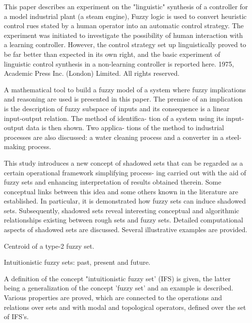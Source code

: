 \cite{Mamdani1975} This paper describes an experiment on the "linguistic"
synthesis of a controller for a model industrial plant (a steam engine), Fuzzy
logic is used to convert heuristic control rues stated by a human operator into
an automatic control strategy. The experiment was initiated to investigate the
possibility of human interaction with a learning controller. However, the
control strategy set up linguistically proved to be far better than expected in
its own right, and the basic experiment of linguistic control synthesis in a
non-learning controller is reported here. {\textcopyright} 1975, Academic Press
Inc. (London) Limited. All rights reserved.

\cite{Takagi1985} A mathematical tool to build a fuzzy model of a system where
fuzzy implications and reasoning are used is presented in this paper. The
premise of an implication is the description of fuzzy subspace of inputs and its
consequence is a linear input-output relation. The method of identifica- tion of
a system using its input-output data is then shown. Two applica- tions of the
method to industrial processes are also discussed: a water cleaning process and
a converter in a steel-making process.


\cite{Pedrycz1998} This study introduces a new concept of shadowed sets that
can be regarded as a certain operational framework simplifying process- ing
carried out with the aid of fuzzy sets and enhancing interpretation of results
obtained therein. Some conceptual links between this idea and some others known
in the literature are established. In particular, it is demonstrated how fuzzy
sets can induce shadowed sets. Subsequently, shadowed sets reveal interesting
conceptual and algorithmic relationships existing between rough sets and fuzzy
sets. Detailed computational aspects of shadowed sets are discussed. Several
illustrative examples are provided.

\cite{Karnik2001} Centroid of a type-2 fuzzy set.

\cite{Atanassov2003} Intuitionistic fuzzy sets: past, present and future.

\cite{Atanassov1986} A definition of the concept "intuitionistic fuzzy set'
(IFS) is given, the latter being a generalization of the concept 'fuzzy set' and
an example is described. Various properties are proved, which are connected to
the operations and relations over sets and with modal and topological operators,
defined over the set of IFS's.

